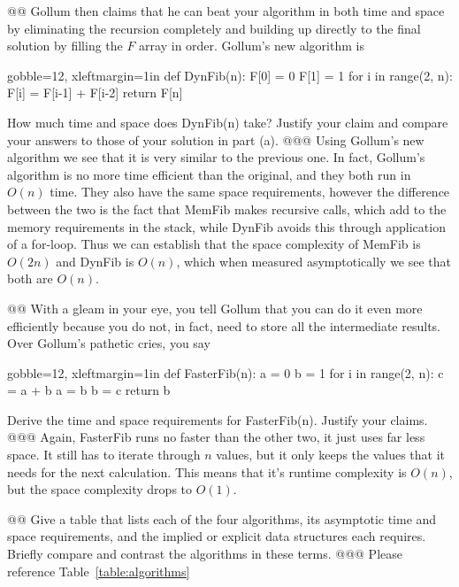 \documentclass[10pt]{article}
\begin{document}
\begin{easylist}[enumerate]
    @@ Gollum then claims that he can beat your algorithm in both time and space by eliminating the recursion completely
    and building up directly to the final solution by filling the $F$ array in order. Gollum's new algorithm is

        \begin{pythoncode*}{gobble=12, xleftmargin=1in}
            def DynFib(n):
                F[0] = 0
                F[1] = 1
                for i in range(2, n):
                    F[i] = F[i-1] + F[i-2]
                return F[n]
        \end{pythoncode*}

    How much time and space does DynFib(n) take? Justify your claim and compare your answers to those of your solution
    in part (a).
    @@@ Using Gollum's new algorithm we see that it is very similar to the previous one. In fact, Gollum's algorithm is
    no more time efficient than the original, and they both run in $O(n)$ time. They also have the same space
    requirements, however the difference between the two is the fact that MemFib makes recursive calls, which add to the
    memory requirements in the stack, while DynFib avoids this through application of a {\ttfamily for}-loop. Thus we
    can establish that the space complexity of MemFib is $O(2n)$ and DynFib is $O(n)$, which when measured
    asymptotically we see that both are $O(n)$.

    @@ With a gleam in your eye, you tell Gollum that you can do it even more efficiently because you do not, in fact,
    need to store all the intermediate results.  Over Gollum's pathetic cries, you say

        \begin{pythoncode*}{gobble=12, xleftmargin=1in}
            def FasterFib(n):
                a = 0
                b = 1
                for i in range(2, n):
                    c = a + b
                    a = b
                    b = c
                return b
        \end{pythoncode*}

    Derive the time and space requirements for FasterFib(n). Justify your claims.
    @@@ Again, FasterFib runs no faster than the other two, it just uses far less space. It still has to iterate through
    $n$ values, but it only keeps the values that it needs for the next calculation. This means that it's runtime
    complexity is $O(n)$, but the space complexity drops to $O(1)$.

    @@ Give a table that lists each of the four algorithms, its asymptotic time and space requirements, and the implied
    or explicit data structures each requires.  Briefly compare and contrast the algorithms in these terms.
    @@@ Please reference Table~\ref{table:algorithms}


\end{easylist}
\end{document}
